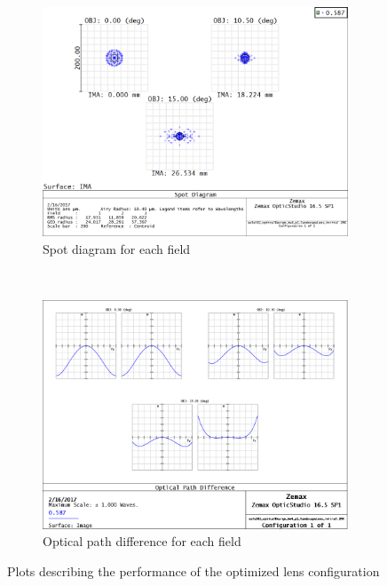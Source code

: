 \documentclass[10pt,a4paper]{article}
\begin{document}
		\begin{figure}[H]
			\centering
			\begin{subfigure}[t]{0.5\textwidth}
				\centering
				\includegraphics[width=\textwidth]{../zemax/2_optimized/spot}
				\caption{Spot diagram for each field}
				\label{spot_opto}
			\end{subfigure}%
			~ 
			\begin{subfigure}[t]{0.5\textwidth}
				\centering
				\includegraphics[width=\textwidth]{../zemax/2_optimized/fan}
				\caption{Optical path difference for each field}
			\end{subfigure}
			\caption{Plots describing the performance of the optimized lens configuration}
		\end{figure}
\end{document}
